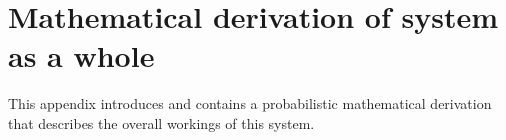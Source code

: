 \chapter{Mathematical derivation of system as a whole}
\label{ap:systemProof}
\ifpdf
    \graphicspath{{Appendix2/Appendix2_Figures/}}
\else
    \graphicspath{{Appendix2/Appendix2_Figures/}}
\fi

This appendix introduces and contains a probabilistic mathematical derivation that describes the overall workings of this system.